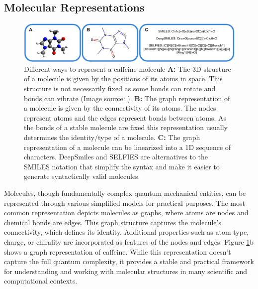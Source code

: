 \subsection{Molecular Representations}
\begin{figure}
    \centering
    \includegraphics[width=\textwidth]{figures/representations/representations.pdf}
    \caption{Different ways to represent a caffeine molecule \textbf{A:}  The 3D structure of a molecule is given by the positions of its atoms in
        space. This structure is not necessarily fixed as some bonds can rotate and bonds can
        vibrate (Image source: \citep{EnglishCaffeine3D2010}). \textbf{B:} The graph
        representation of a molecule is given by the connectivity of its atoms. The nodes
        represent atoms and the edges represent bonds between atoms. As the bonds of a stable
        molecule are fixed this representation usually determines the identity/type of a
        molecule. \textbf{C:} The graph representation of a molecule can be linearized into a 1D
        sequence of characters. DeepSmiles and SELFIES are alternatives to the SMILES notation that
        simplify the syntax and make it easier to generate syntactically valid molecules.\label{fig:molecular-graph}}
\end{figure}
Molecules, though fundamentally complex quantum mechanical entities, can be represented through
various simplified models for practical purposes. The most common representation depicts molecules
as graphs, where atoms are nodes and chemical bonds are edges. This graph structure captures the
molecule's connectivity, which defines its identity. Additional properties such as atom type,
charge, or chirality are incorporated as features of the nodes and edges.
Figure \ref{fig:molecular-graph}b shows a graph representation of caffeine. While this representation
doesn't capture the full quantum complexity, it provides a stable and practical framework for
understanding and working with molecular structures in many scientific and computational contexts.

